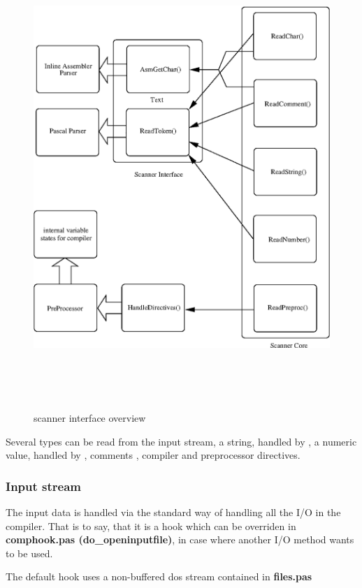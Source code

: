 \documentclass [a4paper,12pt]{article}
\begin{document}
\begin{figure}
\includegraphics[width=5.87in,height=6.90in]{arch2.eps}
\fi
\caption{scanner interface overview}
\label{fig2}
\end{figure}

Several types can be read from the input stream, a string, handled by
, a numeric value, handled by , comments , compiler
and preprocessor directives.

\subsubsection{Input stream}
\label{subsubsec:input}

The input data is handled via the standard way of handling all the I/O in
the compiler. That is to say, that it is a hook which can be overriden in
\textbf{comphook.pas (do{\_}openinputfile)}, in case where another I/O
method wants to be used.

The default hook uses a non-buffered dos stream contained in
\textbf{files.pas}
\end{document}
